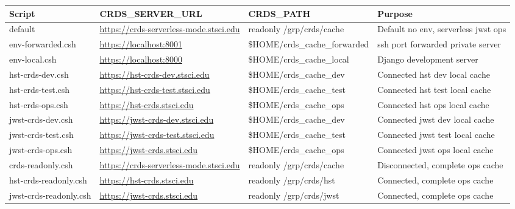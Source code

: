 \documentclass[letterpaper,10pt,english]{sphinxmanual}
\begin{document}
\begin{tabulary}{\linewidth}{|L|L|L|L|}
\hline
\textbf{
Script
} & \textbf{
CRDS\_SERVER\_URL
} & \textbf{
CRDS\_PATH
} & \textbf{
Purpose
}\\\hline

default
 & 
\href{https://crds-serverless-mode.stsci.edu}{https://crds-serverless-mode.stsci.edu}
 & 
readonly /grp/crds/cache
 & 
Default no env, serverless jwst ops
\\\hline

env-forwarded.csh
 & 
\href{https://localhost:8001}{https://localhost:8001}
 & 
\$HOME/crds\_cache\_forwarded
 & 
ssh port forwarded private server
\\\hline

env-local.csh
 & 
\href{https://localhost:8000}{https://localhost:8000}
 & 
\$HOME/crds\_cache\_local
 & 
Django development server
\\\hline

hst-crds-dev.csh
 & 
\href{https://hst-crds-dev.stsci.edu}{https://hst-crds-dev.stsci.edu}
 & 
\$HOME/crds\_cache\_dev
 & 
Connected hst dev local cache
\\\hline

hst-crds-test.csh
 & 
\href{https://hst-crds-test.stsci.edu}{https://hst-crds-test.stsci.edu}
 & 
\$HOME/crds\_cache\_test
 & 
Connected hst test local cache
\\\hline

hst-crds-ops.csh
 & 
\href{https://hst-crds.stsci.edu}{https://hst-crds.stsci.edu}
 & 
\$HOME/crds\_cache\_ops
 & 
Connected hst ops local cache
\\\hline

jwst-crds-dev.csh
 & 
\href{https://jwst-crds-dev.stsci.edu}{https://jwst-crds-dev.stsci.edu}
 & 
\$HOME/crds\_cache\_dev
 & 
Connected jwst dev local cache
\\\hline

jwst-crds-test.csh
 & 
\href{https://jwst-crds-test.stsci.edu}{https://jwst-crds-test.stsci.edu}
 & 
\$HOME/crds\_cache\_test
 & 
Connected jwst test local cache
\\\hline

jwst-crds-ops.csh
 & 
\href{https://jwst-crds.stsci.edu}{https://jwst-crds.stsci.edu}
 & 
\$HOME/crds\_cache\_ops
 & 
Connected jwst ops local cache
\\\hline

crds-readonly.csh
 & 
\href{https://crds-serverless-mode.stsci.edu}{https://crds-serverless-mode.stsci.edu}
 & 
readonly /grp/crds/cache
 & 
Disconnected, complete ops cache
\\\hline

hst-crds-readonly.csh
 & 
\href{https://hst-crds.stsci.edu}{https://hst-crds.stsci.edu}
 & 
readonly /grp/crds/hst
 & 
Connected, complete ops cache
\\\hline

jwst-crds-readonly.csh
 & 
\href{https://jwst-crds.stsci.edu}{https://jwst-crds.stsci.edu}
 & 
readonly /grp/crds/jwst
 & 
Connected, complete ops cache
\\\hline
\end{tabulary}
\end{document}
